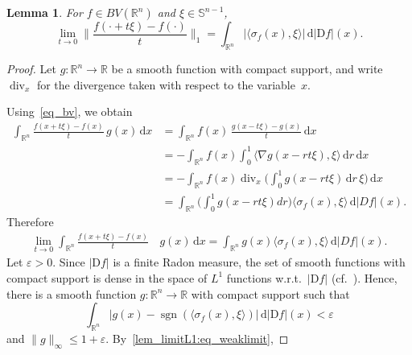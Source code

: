 \documentclass{amsart}
\newtheorem{lemma}[theorem]{Lemma}
\newcommand{\snvtex}{{\mathbb S}^{n-1}}
\newcommand{\sgn}{\operatorname{sgn}}
\newcommand{\dvtex}{\,\mathrm{d}}
\newcommand{\Dvtex}{\mathrm{D}}
\renewcommand \div {\operatorname{div}}
\begin{document}
\begin{lemma}
\label{lem_limitL1}
For $f \in BV(\mathbb R^{n})$ and $\xi \in \snvtex $,
%
\begin{equation*}
\lim _{t\to 0} \Big\|\frac{f(\cdot +t\xi )-f(\cdot )}{t}\Big\|_{1} =
\int _{\mathbb R^{n}} |\langle \sigma _{f}(x), \xi \rangle | \dvtex |\Dvtex f|(x).
\end{equation*}
%
\end{lemma}

\begin{proof}
Let $g:\mathbb R^{n}\to \mathbb R$ be a smooth function with compact support,
and write $\div _{x}$ for the divergence taken with respect to the variable~$x$.

Using~\eqref{eq_bv}, we obtain
%
\begin{align*}
\int _{\mathbb R^{n}} \frac{f(x+t\xi )-f(x)}{t}\,g(x) \dvtex x
&= \int _{\mathbb R^{n}} f(x) \,\frac{g(x-t\xi )-g(x)}{t} \dvtex x
\\
&= - \int _{\mathbb R^{n}} f(x) \int _{0}^{1} \langle \nabla g(x-r t
\xi ), \xi \rangle \dvtex r \dvtex x
\\
&= - \int _{\mathbb R^{n}} f(x) \div _{x}\Big(\int _{0}^{1} g(x-r t
\xi ) \dvtex r\, \xi \Big)\dvtex x
\\
&= \int _{\mathbb R^{n}} \Big(\int _{0}^{1} g(x-r t\xi ) d r \Big)
\langle \sigma _{f}(x),\xi \rangle \dvtex |D f|(x).
\end{align*}
%
Therefore
%
\begin{equation}
\label{lem_limitL1:eq_weaklimit}
%
\begin{split}
\lim _{t\to 0}\int _{\mathbb R^{n}}
\frac{f(x+t\xi )-f(x)}{t}&\,g(x) \dvtex x
= \int _{\mathbb R^{n}} g(x) \langle \sigma _{f}(x),\xi \rangle \dvtex |D f|(x).
\end{split}
%
\end{equation}
%
\noindent
Let $\varepsilon > 0$. Since $|\Dvtex f|$ is a finite Radon measure, the set
of smooth functions with compact support is dense in the space of
$L^{1}$ functions w.r.t.\ $\vert \Dvtex f\vert $ (cf.~\cite[Proposition~7.9]{Folland}).
Hence, there is a smooth function $g:\mathbb R^{n} \to \mathbb R$ with
compact support such that
%
\begin{equation*}
\int _{\mathbb R^{n}} \vert g(x) - \sgn (\langle \sigma _{f}(x), \xi
\rangle )\vert \dvtex \vert \Dvtex f\vert (x) <\varepsilon
\end{equation*}
%
and $\|g\|_{\infty }\leq 1+\varepsilon $. By~\eqref{lem_limitL1:eq_weaklimit},

\end{proof}
\end{document}
